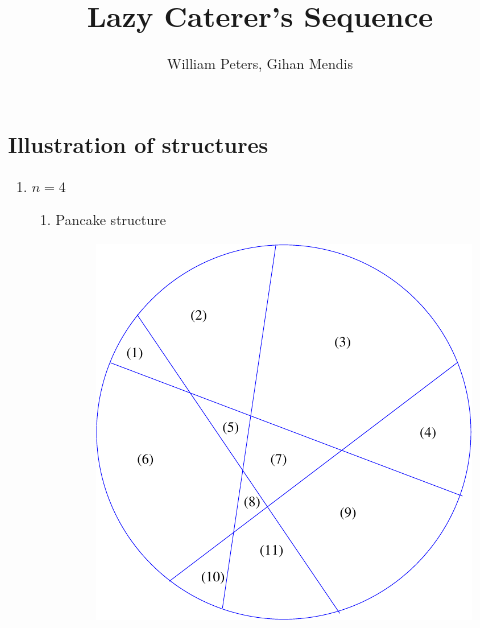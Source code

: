 \documentclass[a4paper,10pt]{article}
\title{Lazy Caterer's Sequence}
\author{William Peters, Gihan Mendis}
\begin{document}
\maketitle

\subsection{Illustration of structures }
\begin{enumerate}
  \item $n = 4$\\


  	\begin{enumerate}
    	\item Pancake structure\\
    	\begin{figure}[h!]
			\includegraphics[scale=0.3]{graphics/pancakecut11}
			\captionsetup{labelformat=empty}
			\caption{}
			\label{fig:pancakecut11}
		\end{figure}
   

\end{enumerate}
\end{enumerate}
\end{document}

